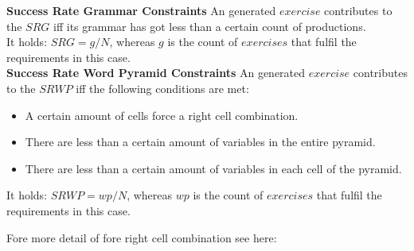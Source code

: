 \noindent\textbf{Success Rate Grammar Constraints}
An generated $exercise$ contributes to the $SRG$ iff its grammar has got less than a certain count of productions.\\
It holds: $SRG = g / N$, whereas $g$ is the count of $exercises$ that fulfil the requirements in this case.\\

\noindent\textbf{Success Rate Word Pyramid Constraints}
An generated $exercise$ contributes to the $SRWP$ iff the following conditions are met:
\begin{itemize}
	\item A certain amount of cells force a right cell combination.
	\item There are less than a certain amount of variables in the entire pyramid.
	\item There are less than a certain amount of variables in each cell of the pyramid.
\end{itemize}
It holds: $SRWP = wp / N$, whereas $wp$ is the count of $exercises$ that fulfil the requirements in this case.
\pagebreak

\noindent Fore more detail of fore right cell combination see here:\\

\noindent 
{}


\pagebreak
